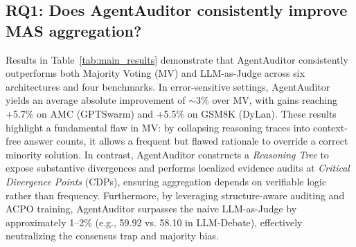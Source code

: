 \documentclass{article}
\theoremstyle{plain}
\theoremstyle{definition}
\theoremstyle{remark}
\begin{document}
\subsection{RQ1: Does \textbf{AgentAuditor} consistently improve MAS aggregation?}
Results in Table~\ref{tab:main_results} demonstrate that AgentAuditor consistently outperforms both Majority Voting (MV) and LLM-as-Judge across six architectures and four benchmarks. 
In error-sensitive settings, AgentAuditor yields an average absolute improvement of $\sim$3\% over MV, with gains reaching +5.7\% on AMC (GPTSwarm) and +5.5\% on GSM8K (DyLan). 
These results highlight a fundamental flaw in MV: by collapsing reasoning traces into context-free answer counts, it allows a frequent but flawed rationale to override a correct minority solution. 
In contrast, AgentAuditor constructs a \textit{Reasoning Tree} to expose substantive divergences and performs localized evidence audits at \textit{Critical Divergence Points} (CDPs), ensuring aggregation depends on verifiable logic rather than frequency. 
Furthermore, by leveraging structure-aware auditing and ACPO training, AgentAuditor surpasses the naive LLM-as-Judge by approximately 1--2\% (e.g., 59.92 vs. 58.10 in LLM-Debate), effectively neutralizing the consensus trap and majority bias.



\end{document}

